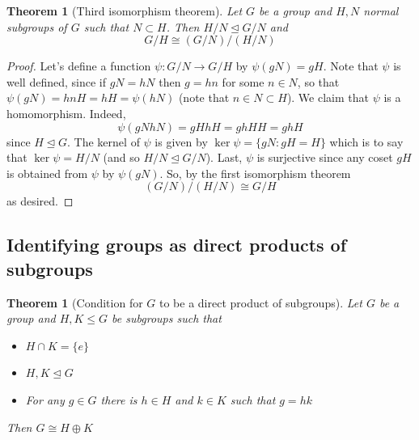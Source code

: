 \documentclass[12pt]{article}
\numberwithin{equation}{subsection}
\newtheorem{thm}[subsection]{Theorem}
\theoremstyle{note}
\newcommand{\nrml}{\trianglelefteq}
\begin{document}
\begin{thm}[Third isomorphism theorem]
Let $G$ be a group and $H,N$ normal subgroups of $G$ such that $N\subset H$. Then $H/N \nrml G/N$ and \begin{equation} G/H \cong (G/N) / (H/N)\end{equation}
\end{thm}

\begin{proof}
	Let's define a function $\psi\colon G/N\to G/H$ by $\psi(gN)=gH$. Note that $\psi$ is well defined, since if $gN=hN$ then $g=hn$ for some $n\in N$, so that $\psi(gN)=hnH=hH=\psi(hN)$ (note that $n\in N\subset H$). We claim that $\psi$ is a homomorphism. Indeed, \[\psi(gN hN)=gHhH=ghHH=ghH\] since $H\nrml G$. The kernel of $\psi$ is given by $\ker\psi=\{gN : gH=H\}$ which is to say that $\ker\psi=H/N$ (and so $H/N\nrml G/N$). Last, $\psi$ is surjective since any coset $gH$ is obtained from $\psi$ by $\psi(gN)$. So, by the first isomorphism theorem \[ (G/N) / (H/N) \cong G/H\] as desired.
\end{proof}





\subsection{Identifying groups as direct products of subgroups}

\begin{thm}[Condition for $G$ to be a direct product of subgroups] \label{product-subgroup}
	Let $G$ be a group and $H,K\leq G$ be subgroups such that \begin{itemize}
		\item $H\cap K=\{e\}$
		\item $H,K\nrml G$
		\item For any $g\in G$ there is $h\in H$ and $k\in K$ such that $g=hk$
	\end{itemize}
	Then $G\cong H\oplus K$
\end{thm}
\end{document}
